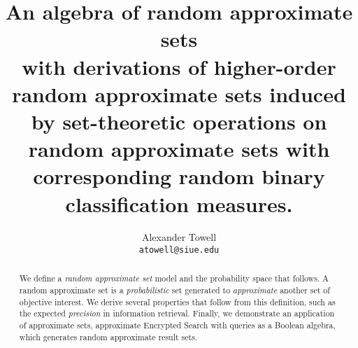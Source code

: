 \documentclass[10pt,final,hidelinks]{article}
\title
{
    An algebra of random approximate sets\\
    \large with derivations of higher-order random approximate sets induced by set-theoretic operations on random approximate sets with corresponding random binary classification measures.
}
\author
{
    Alexander Towell\\
    \texttt{atowell@siue.edu}
}
\date{}
\numberwithin{equation}{section}
\begin{document}
\maketitle
\begin{abstract}
We define a \emph{random approximate set} model and the probability space that 
follows.
A random approximate set is a \emph{probabilistic} set generated to \emph{approximate} another set of objective interest.
We derive several properties that follow from this definition, such as the expected \emph{precision} in information retrieval.
Finally, we demonstrate an application of approximate sets, approximate Encrypted Search with queries as a Boolean algebra, which generates random approximate result sets.
\end{abstract}

\tableofcontents

%













\end{document}
